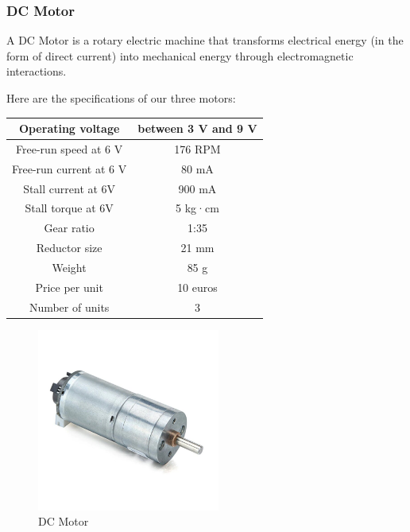 \subsubsection{DC Motor}
A DC Motor is a rotary electric machine that transforms electrical energy
(in the form of direct current) into mechanical energy through electromagnetic interactions.


Here are the specifications of our three motors:

\begin{center}
    \begin{tabular}{ |c|c| }
        \hline
        Operating voltage       & between 3 V and 9 V \\
        \hline
        Free-run speed at 6 V   & 176 RPM             \\
        \hline
        Free-run current at 6 V & 80 mA               \\
        \hline
        Stall current at 6V     & 900 mA              \\
        \hline
        Stall torque at 6V     & 5 kg·cm             \\
        \hline
        Gear ratio              & 1:35                \\
        \hline
        Reductor size           & 21 mm               \\
        \hline
        Weight                  & 85 g                \\
        \hline
        Price per unit          & 10 euros            \\
        \hline
        Number of units         & 3                   \\
        \hline
    \end{tabular}
\end{center}

\begin{figure}[H]
    \centering
    \includegraphics[width=6cm]{img/components/motor.jpg}
    \caption{DC Motor}
    \label{fig: DC Motor}
\end{figure}

